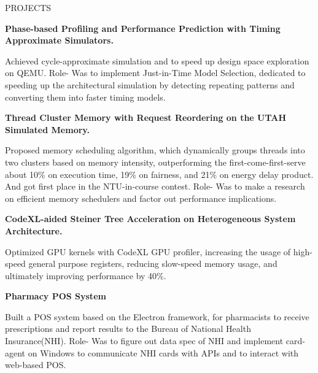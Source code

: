 \documentclass{resume} %
\begin{document}
\begin{rSection}{PROJECTS}

\textbf{Phase-based Profiling and Performance Prediction with Timing
  Approximate Simulators.}
\begin{outline}
  \1 Achieved cycle-approximate simulation and to speed up design space
  exploration on QEMU.
  \1 Role- Was to implement Just-in-Time Model Selection, dedicated to speeding
  up the architectural simulation by detecting repeating patterns and converting
  them into faster timing models.
\end{outline}

\textbf{Thread Cluster Memory with Request Reordering on the UTAH
  Simulated Memory.}
\begin{outline}
  \1 Proposed memory scheduling algorithm, which dynamically groups threads into
  two clusters based on memory intensity, outperforming the
  first-come-first-serve about 10\% on execution time, 19\% on fairness, and
  21\% on energy delay product. And got first place in the NTU-in-course contest.
  \1 Role- Was to make a research on efficient memory schedulers and factor out performance implications.
\end{outline}

\textbf{CodeXL-aided Steiner Tree Acceleration on Heterogeneous System
  Architecture.}
\begin{outline}
  \1 Optimized GPU kernels with CodeXL GPU profiler, increasing the usage of
  high-speed general purpose registers, reducing slow-speed memory usage, and
  ultimately improving performance by 40\%.
\end{outline}

\textbf{Pharmacy POS System}
\begin{outline}
  \1 Built a POS system based on the Electron framework, for pharmacists to
  receive prescriptions and report results to the Bureau of National Health Insurance(NHI).
  \1 Role- Was to figure out data spec of NHI and implement card-agent on Windows to
communicate NHI cards with APIs and to interact with web-based POS.
\end{outline}

\end{rSection} %
\end{document}

